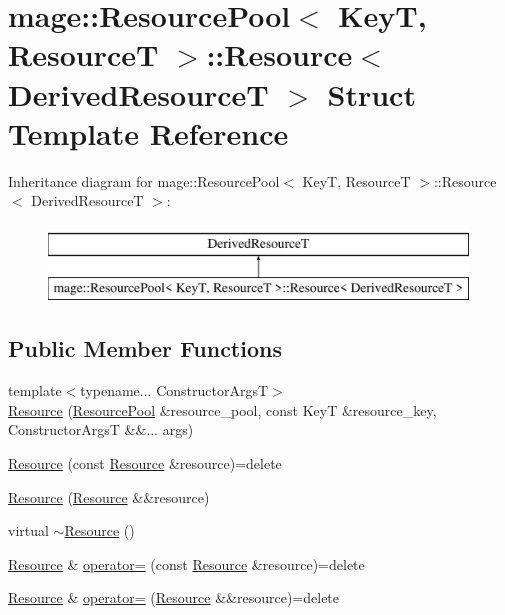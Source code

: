 \hypertarget{structmage_1_1_resource_pool_1_1_resource}{}\section{mage\+:\+:Resource\+Pool$<$ KeyT, ResourceT $>$\+:\+:Resource$<$ Derived\+ResourceT $>$ Struct Template Reference}
\label{structmage_1_1_resource_pool_1_1_resource}
Inheritance diagram for mage\+:\+:Resource\+Pool$<$ KeyT, ResourceT $>$\+:\+:Resource$<$ Derived\+ResourceT $>$\+:\begin{figure}[H]
\begin{center}
\leavevmode
\includegraphics[height=2.000000cm]{structmage_1_1_resource_pool_1_1_resource}
\end{center}
\end{figure}
\subsection*{Public Member Functions}
\begin{DoxyCompactItemize}
\item 
{\footnotesize template$<$typename... Constructor\+ArgsT$>$ }\\\hyperlink{structmage_1_1_resource_pool_1_1_resource_a552bb997277371d36aa1bf2248d83f4f}{Resource} (\hyperlink{classmage_1_1_resource_pool}{Resource\+Pool} \&resource\+\_\+pool, const KeyT \&resource\+\_\+key, Constructor\+ArgsT \&\&... args)
\item 
\hyperlink{structmage_1_1_resource_pool_1_1_resource_a783237133052c9e41b4c2d02fcdeefec}{Resource} (const \hyperlink{structmage_1_1_resource_pool_1_1_resource}{Resource} \&resource)=delete
\item 
\hyperlink{structmage_1_1_resource_pool_1_1_resource_a1c8016d99e1496da9383cbc4f727a913}{Resource} (\hyperlink{structmage_1_1_resource_pool_1_1_resource}{Resource} \&\&resource)
\item 
virtual \hyperlink{structmage_1_1_resource_pool_1_1_resource_a1d8bd565ab8769cedd94c1a42c6ebf46}{$\sim$\+Resource} ()
\item 
\hyperlink{structmage_1_1_resource_pool_1_1_resource}{Resource} \& \hyperlink{structmage_1_1_resource_pool_1_1_resource_a9c619f220b0fa676111cd24cb575dbff}{operator=} (const \hyperlink{structmage_1_1_resource_pool_1_1_resource}{Resource} \&resource)=delete
\item 
\hyperlink{structmage_1_1_resource_pool_1_1_resource}{Resource} \& \hyperlink{structmage_1_1_resource_pool_1_1_resource_a56f04f53400e77ddcc3c26fad1342e31}{operator=} (\hyperlink{structmage_1_1_resource_pool_1_1_resource}{Resource} \&\&resource)=delete
\end{DoxyCompactItemize}
